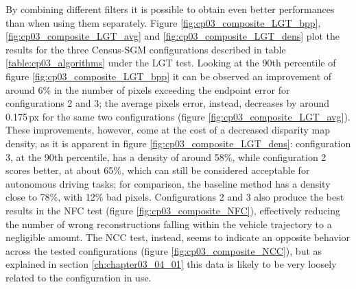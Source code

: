 By combining different filters it is possible to obtain even better performances than when using them separately. Figure \ref{fig:cp03_composite_LGT_bpp}, \ref{fig:cp03_composite_LGT_avg} and \ref{fig:cp03_composite_LGT_dens} plot the results for the three Census-SGM configurations described in table \ref{table:cp03_algorithms} under the LGT test. Looking at the 90th percentile of figure \ref{fig:cp03_composite_LGT_bpp} it can be observed an improvement of around 6\% in the number of pixels exceeding the endpoint error for configurations 2 and 3; the average pixels error, instead, decreases by around 0.175\,px for the same two configurations (figure \ref{fig:cp03_composite_LGT_avg}). These improvements, however, come at the cost of a decreased disparity map density, as it is apparent in figure \ref{fig:cp03_composite_LGT_dens}: configuration 3, at the 90th percentile, has a density of around 58\%, while configuration 2 scores better, at about 65\%, which can still be considered acceptable for autonomous driving tasks; for comparison, the baseline 
method has a density close to 78\%, with 12\% bad pixels. Configurations 2 and 3 also produce the best results in the NFC test (figure \ref{fig:cp03_composite_NFC}), effectively reducing the number of wrong reconstructions falling within the vehicle trajectory to a negligible amount. The NCC test, instead, seems to indicate an opposite behavior across the tested configurations (figure \ref{fig:cp03_composite_NCC}), but as explained in section \ref{ch:chapter03_04_01} this data is likely to be very loosely related to the configuration in use.

